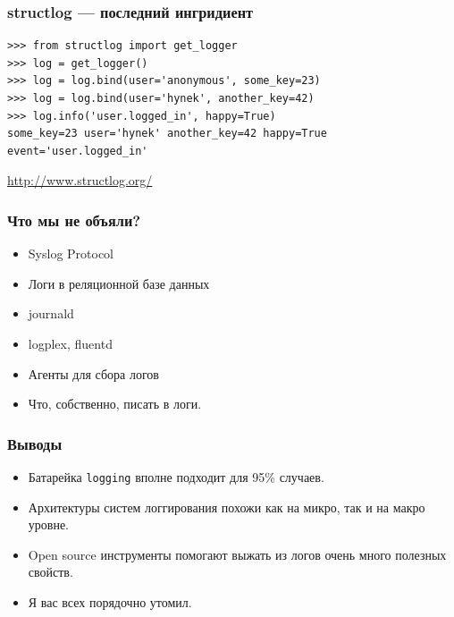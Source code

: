 \documentclass[aspectratio=169]{beamer}
\begin{document}
\begin{frame}[fragile]
  \frametitle{structlog --- последний ингридиент}

  \begin{lstlisting}
>>> from structlog import get_logger
>>> log = get_logger()
>>> log = log.bind(user='anonymous', some_key=23)
>>> log = log.bind(user='hynek', another_key=42)
>>> log.info('user.logged_in', happy=True)
some_key=23 user='hynek' another_key=42 happy=True event='user.logged_in'
  \end{lstlisting}

  \vspace{0.5cm}
  \begin{center}
    \url{http://www.structlog.org/}
  \end{center}
\end{frame}


\begin{frame}
  \frametitle{Что мы не объяли?}

  \begin{itemize}
    \item Syslog Protocol
    \item Логи в реляционной базе данных
    \item journald
    \item logplex, fluentd
    \item Агенты для сбора логов
    \item Что, собственно, писать в логи.
  \end{itemize}

\end{frame}


\begin{frame}
  \frametitle{Выводы}

  \begin{itemize}
  \item Батарейка {\tt logging} вполне подходит для 95\% случаев\footnotemark.
  \pause
  \item Архитектуры систем логгирования похожи как на микро, так и на макро уровне.
  \pause
  \item Open source инструменты помогают выжать из логов очень много полезных свойств.
  \pause
  \item Я вас всех порядочно утомил.
  \end{itemize}

\end{frame}
\end{document}
